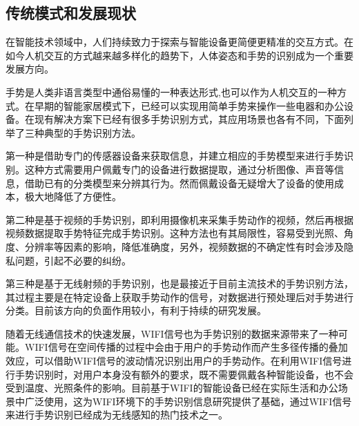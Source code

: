 \documentclass[a4paper]{article}
\begin{document}
\subsection{传统模式和发展现状}
  在智能技术领域中，人们持续致力于探索与智能设备更简便更精准的交互方式。在如今人机交互的方式越来越多样化的趋势下，人体姿态和手势的识别成为一个重要发展方向。\par
  手势是人类非语言类型中通俗易懂的一种表达形式,也可以作为人机交互的一种方式。在早期的智能家居模式下，已经可以实现用简单手势来操作一些电器和办公设备。在现有解决方案下已经有很多手势识别方式，其应用场景也各有不同，下面列举了三种典型的手势识别方法。 \par
  第一种是借助专门的传感器设备来获取信息，并建立相应的手势模型来进行手势识别。这种方式需要用户佩戴专门的设备进行数据提取，通过分析图像、声音等信息，借助已有的分类模型来分辨其行为。然而佩戴设备无疑增大了设备的使用成本，极大地降低了方便性。\par
  第二种是基于视频的手势识别，即利用摄像机来采集手势动作的视频，然后再根据视频数据提取手势特征完成手势识别。这种方法也有其局限性，容易受到光照、角度、分辨率等因素的影响，降低准确度，另外，视频数据的不确定性有时会涉及隐私问题，引起不必要的纠纷。\par
  第三种是基于无线射频的手势识别，也是最接近于目前主流技术的手势识别方法，其过程主要是在特定设备上获取手势动作的信号，对数据进行预处理后对手势进行分类。目前该方向的负面作用较小，有利于持续的研究发展。\par
  随着无线通信技术的快速发展，WIFI信号也为手势识别的数据来源带来了一种可能。WIFI信号在空间传播的过程中会由于用户的手势动作而产生多径传播的叠加效应，可以借助WIFI信号的波动情况识别出用户的手势动作。在利用WIFI信号进行手势识别时，对用户本身没有额外的要求，既不需要佩戴各种智能设备，也不会受到温度、光照条件的影响。目前基于WIFI的智能设备已经在实际生活和办公场景中广泛使用，这为WIFI环境下的手势识别信息研究提供了基础，通过WIFI信号来进行手势识别已经成为无线感知的热门技术之一\citep{gesture}。
\end{document}
